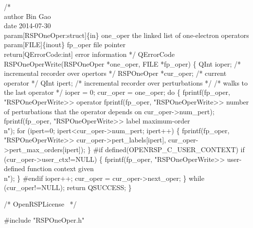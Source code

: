 /*%
    \\author Bin Gao
    \\date 2014-07-30
    \\param[RSPOneOper:struct]\{in\} one_oper the linked list of one-electron operators
    \\param[FILE]\{inout\} fp_oper file pointer
    \\return[QErrorCode:int] error information
*/
QErrorCode RSPOneOperWrite(RSPOneOper *one_oper, FILE *fp_oper)
\{
    QInt ioper;            /* incremental recorder over opertors */
    RSPOneOper *cur_oper;  /* current operator */
    QInt ipert;            /* incremental recorder over perturbations */
    /* walks to the last operator */
    ioper = 0;
    cur_oper = one_oper;
    do \{
        fprintf(fp_oper, "RSPOneOperWrite>> operator %
        fprintf(fp_oper,
                "RSPOneOperWrite>> number of perturbations that the operator depends on %
                cur_oper->num_pert);
        fprintf(fp_oper, "RSPOneOperWrite>> label           maximum-order\\n");
        for (ipert=0; ipert<cur_oper->num_pert; ipert++) \{
            fprintf(fp_oper,
                    "RSPOneOperWrite>>       %
                    cur_oper->pert_labels[ipert],
                    cur_oper->pert_max_orders[ipert]);
        \}
#if defined(OPENRSP_C_USER_CONTEXT)
        if (cur_oper->user_ctx!=NULL) \{
            fprintf(fp_oper, "RSPOneOperWrite>> user-defined function context given\\n");
        \}
#endif
        ioper++;
        cur_oper = cur_oper->next_oper;
    \} while (cur_oper!=NULL);
    return QSUCCESS;
\}

\nwendcode{}\endmoddef
/*
  \LA{}OpenRSPLicense~{\nwtagstyle{}}\RA{}
*/

#include "RSPOneOper.h"

